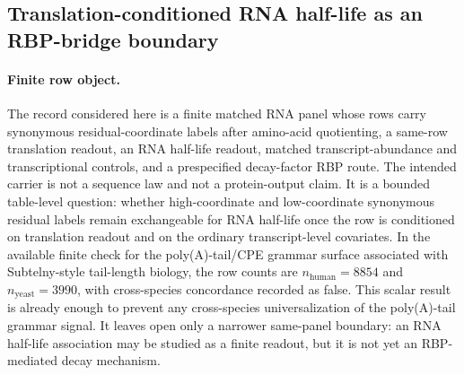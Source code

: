 
\subsection{Translation-conditioned RNA half-life as an RBP-bridge boundary}
\label{subsec:biorality-q6-rna-half-life-rbp-bridge}

\paragraph{Finite row object.}
The record considered here is a finite matched RNA panel whose rows carry synonymous residual-coordinate labels after amino-acid quotienting, a same-row translation readout, an RNA half-life readout, matched transcript-abundance and transcriptional controls, and a prespecified decay-factor RBP route.  The intended carrier is not a sequence law and not a protein-output claim.  It is a bounded table-level question: whether high-coordinate and low-coordinate synonymous residual labels remain exchangeable for RNA half-life once the row is conditioned on translation readout and on the ordinary transcript-level covariates.  In the available finite check for the poly(A)-tail/CPE grammar surface associated with Subtelny-style tail-length biology, the row counts are $n_{\mathrm{human}} = 8854$ and $n_{\mathrm{yeast}} = 3990$, with cross-species concordance recorded as false.  This scalar result is already enough to prevent any cross-species universalization of the poly(A)-tail grammar signal.  It leaves open only a narrower same-panel boundary: an RNA half-life association may be studied as a finite readout, but it is not yet an RBP-mediated decay mechanism.

